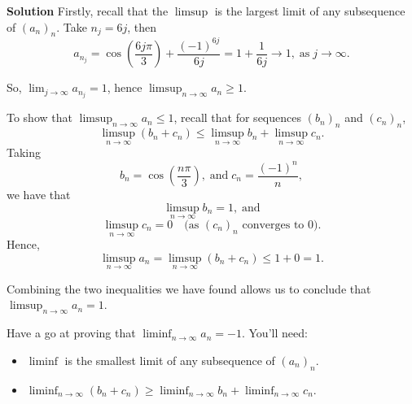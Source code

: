 \documentclass[
  10pt,
  a4paper]{article}
\providecommand{\tightlist}{%
  \setlength{\itemsep}{0pt}\setlength{\parskip}{0pt}}
\theoremstyle{plain}
\theoremstyle{definition}
\theoremstyle{plain}
\theoremstyle{plain}
\theoremstyle{plain}
\theoremstyle{plain}
\theoremstyle{definition}
\theoremstyle{definition}
\theoremstyle{remark}
\theoremstyle{remark}
\begin{document}
\textbf{Solution}
Firstly, recall that the \(\limsup\) is the largest limit of any subsequence of \((a_n)_n\). Take \(n_j = 6j\), then \[a_{n_j} = \cos\left(\frac{6j\pi}{3}\right) + \frac{(-1)^{6j}}{6j} = 1 + \frac{1}{6j} \to 1, \; \text{as} \; j \to \infty.\]

So, \(\lim_{j \to \infty} a_{n_j} = 1\), hence \(\limsup_{n \to \infty} a_n \geq 1\).

To show that \(\limsup_{n \to \infty} a_n \leq 1\), recall that for sequences \((b_n)_n\) and \((c_n)_n\), \[\limsup_{n \to \infty}(b_n + c_n) \leq \limsup_{n \to \infty}b_n + \limsup_{n \to \infty}c_n.\] Taking \[b_n = \cos\left(\frac{n\pi}{3}\right), \; \text{and} \; c_n = \frac{(-1)^n}{n},\] we have that \[\limsup_{n \to \infty} b_n = 1, \; \text{and}\] \[\limsup_{n \to \infty} c_n = 0 \quad \text{(as $(c_n)_n$ converges to $0$)}.\] Hence,
\[\limsup_{n \to \infty} a_n = \limsup_{n \to \infty}(b_n + c_n) \leq 1 + 0 = 1.\]

Combining the two inequalities we have found allows us to conclude that \(\limsup_{n \to \infty} a_n = 1.\)

Have a go at proving that \(\liminf_{n \to \infty} a_n = -1\). You'll need:

\begin{itemize}
\tightlist
\item
  \(\liminf\) is the smallest limit of any subsequence of \((a_n)_n\).
\item
  \(\liminf_{n \to \infty}(b_n + c_n) \geq \liminf_{n \to \infty}b_n + \liminf_{n \to \infty}c_n.\)
\end{itemize}
\end{document}
